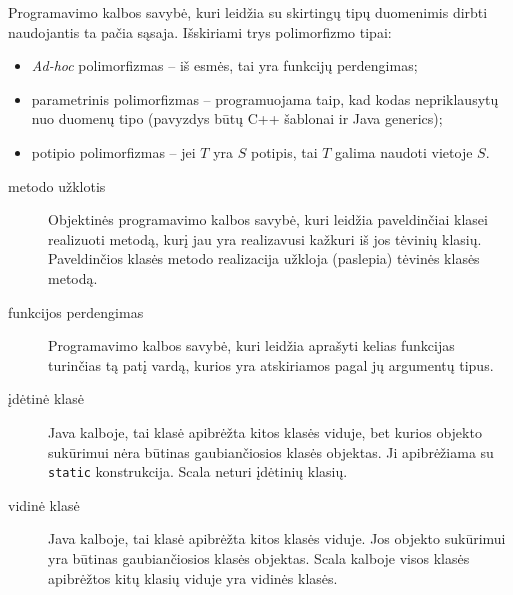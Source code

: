 \begin{glossary}
\begin{entry}
    Programavimo kalbos savybė, kuri leidžia su skirtingų tipų duomenimis
    dirbti naudojantis ta pačia sąsaja. Išskiriami trys polimorfizmo tipai:
    \begin{itemize}
      \item \emph{Ad-hoc} polimorfizmas  –
        iš esmės, tai yra funkcijų perdengimas;
      \item parametrinis polimorfizmas  –
        programuojama taip, kad kodas nepriklausytų nuo duomenų tipo
        (pavyzdys būtų C++ šablonai ir Java generics);
      \item potipio polimorfizmas  – 
        jei $T$ yra $S$ potipis, tai $T$ galima naudoti vietoje $S$.
    \end{itemize}
    
  \end{entry}
\end{glossary}

\begin{description}

  \item[metodo užklotis ]
    Objektinės programavimo kalbos savybė, kuri leidžia paveldinčiai klasei
    realizuoti metodą, kurį jau yra realizavusi kažkuri iš jos tėvinių
    klasių. Paveldinčios klasės metodo realizacija užkloja (paslepia)
    tėvinės klasės metodą.

  \item[funkcijos perdengimas ]
    Programavimo kalbos savybė, kuri leidžia aprašyti kelias funkcijas
    turinčias tą patį vardą, kurios yra atskiriamos pagal jų argumentų
    tipus.

  \item[įdėtinė klasė ]
    Java kalboje, tai klasė apibrėžta kitos klasės viduje, bet
    kurios objekto sukūrimui nėra būtinas gaubiančiosios
    klasės objektas. Ji apibrėžiama su \verb|static| konstrukcija.
    Scala neturi įdėtinių klasių.

  \item[vidinė klasė ]
    Java kalboje, tai klasė apibrėžta kitos klasės viduje. Jos
    objekto sukūrimui yra būtinas gaubiančiosios klasės objektas.
    Scala kalboje visos klasės apibrėžtos kitų klasių viduje
    yra vidinės klasės.

\end{description}
